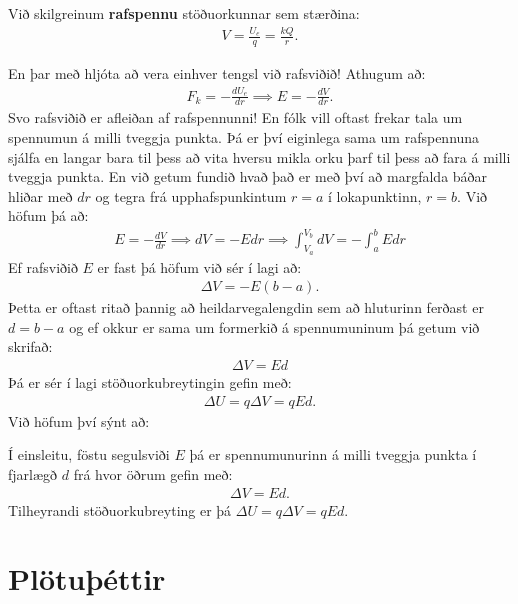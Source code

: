 \begin{tcolorbox}
\begin{definition}
Við skilgreinum \textbf{rafspennu} stöðuorkunnar sem stærðina:
\begin{align*}
    V = \frac{U_e}{q} = \frac{kQ}{r}.
\end{align*}
\end{definition}
\end{tcolorbox}
En þar með hljóta að vera einhver tengsl við rafsviðið! Athugum að:
\begin{align*}
    F_k = -\frac{dU_e}{dr} \implies E = - \frac{dV}{dr}.
\end{align*}
Svo rafsviðið er afleiðan af rafspennunni! En fólk vill oftast frekar tala um spennumun á milli tveggja punkta. Þá er því eiginlega sama um rafspennuna sjálfa en langar bara til þess að vita hversu mikla orku þarf til þess að fara á milli tveggja punkta. En við getum fundið hvað það er með því að margfalda báðar hliðar með $dr$ og tegra frá upphafspunkintum $r = a$ í lokapunktinn, $r=b$. Við höfum þá að:
\begin{align*}
    E = -\frac{dV}{dr} \implies dV = -Edr \implies \int_{V_a}^{V_b} dV = -\int_{a}^{b} E dr
\end{align*}
Ef rafsviðið $E$ er fast þá höfum við sér í lagi að:
\begin{align*}
    \Delta V = -E(b-a).
\end{align*}
Þetta er oftast ritað þannig að heildarvegalengdin sem að hluturinn ferðast er $d = b-a$ og ef okkur er sama um formerkið á spennumuninum þá getum við skrifað:
\begin{align*}
    \Delta V = Ed
\end{align*}
Þá er sér í lagi stöðuorkubreytingin gefin með:
\begin{align*}
    \Delta U = q\Delta V = qEd.
\end{align*}
Við höfum því sýnt að:
\begin{tcolorbox}
\begin{theorem}
Í einsleitu, föstu segulsviði $E$ þá er spennumunurinn á milli tveggja punkta í fjarlægð $d$ frá hvor öðrum gefin með:
\begin{align*}
    \Delta V = Ed.
\end{align*}
Tilheyrandi stöðuorkubreyting er þá $\Delta U = q\Delta V = qEd$.
\end{theorem}
\end{tcolorbox}


\section{Plötuþéttir}


